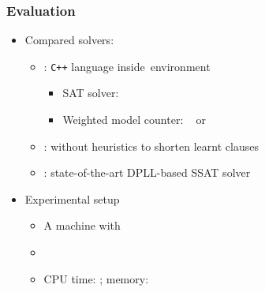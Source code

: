 \renewcommand{\nrandom}{\num{700}}
\renewcommand{\napplication}{\num{212}}
\newcommand{\ntoilet}{\num{77}}
\newcommand{\nmaxcount}{\num{26}}
\newcommand{\nsandcastle}{\num{25}}
\newcommand{\nconformant}{\num{24}}
\newcommand{\nmpec}{\num{60}}

\begin{frame}
    \frametitle{Evaluation}
    \begin{itemize}
        \item Compared solvers:
              \pause
              \begin{itemize}
                  \item \erssat: \texttt{C++} language inside~\abc environment~\cite{ABC}
                        \pause
                        \begin{itemize}
                            \item SAT solver: ~\cite{Een2003Solver}
                                  \pause
                            \item Weighted model counter: \cachet~\cite{Sang2004} or \cudd~\cite{Darwiche2002KnowledgeCompilation}
                                  \pause
                        \end{itemize}
                  \item \erssatb: \erssat without heuristics to shorten learnt clauses
                        \pause
                  \item \dcssat: state-of-the-art DPLL-based SSAT solver
                        \pause
              \end{itemize}
        \item Experimental setup
              \pause
              \begin{itemize}
                  \item A machine with~\machineSpec
                        \pause
                  \item \osInfo
                        \pause
                  \item CPU time: \timelimit; memory: \memlimit
              \end{itemize}
    \end{itemize}
\end{frame}

